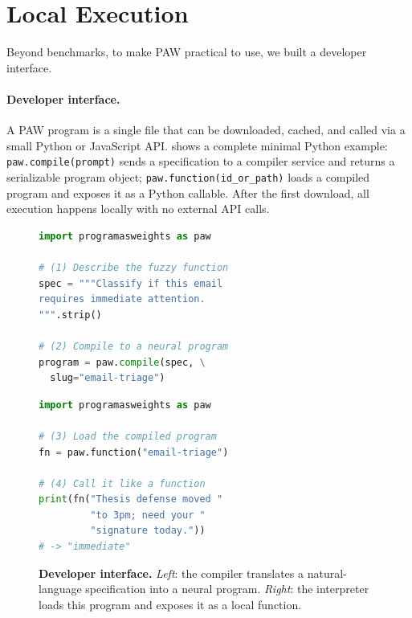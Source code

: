 \documentclass{article}
\theoremstyle{plain}
\theoremstyle{definition}
\theoremstyle{remark}
\begin{document}
\section{Local Execution}
\label{sec:execution}

Beyond benchmarks, to make PAW practical to use, we built a developer interface.

\paragraph{Developer interface.}
A PAW program is a single file that can be downloaded, cached, and called via a small Python or JavaScript API.  shows a complete minimal Python example: \texttt{paw.compile(prompt)} sends a specification to a compiler service and returns a serializable program object; \texttt{paw.function(id\_or\_path)} loads a compiled program and exposes it as a Python callable. After the first download, all execution happens locally with no external API calls.

\begin{figure}[!t]
  \centering
  \begin{minipage}[t]{0.48\textwidth}
  \vspace{0pt}
  \begin{lstlisting}[language=Python,
      basicstyle=\ttfamily\small,
      keywordstyle=\color{blue!60!black},
      commentstyle=\color{green!50!black},
      stringstyle=\color{orange!70!black},
      showstringspaces=false,
      frame=single,
      caption={Compile a fuzzy function},
      captionpos=b]
import programasweights as paw

# (1) Describe the fuzzy function
spec = """Classify if this email  
requires immediate attention.
""".strip()

# (2) Compile to a neural program
program = paw.compile(spec, \
  slug="email-triage")
  \end{lstlisting}
  \end{minipage}
  \hfill
  \begin{minipage}[t]{0.48\textwidth}
  \vspace{0pt}
  \begin{lstlisting}[language=Python,
      basicstyle=\ttfamily\small,
      keywordstyle=\color{blue!60!black},
      commentstyle=\color{green!50!black},
      stringstyle=\color{orange!70!black},
      showstringspaces=false,
      frame=single,
      caption={Run the compiled program locally},
      captionpos=b]
import programasweights as paw

# (3) Load the compiled program
fn = paw.function("email-triage")

# (4) Call it like a function
print(fn("Thesis defense moved "
         "to 3pm; need your "
         "signature today."))
# -> "immediate"
  \end{lstlisting}
  \end{minipage}
  \caption{\label{fig:paw-api}\textbf{Developer interface.} \emph{Left}: the compiler translates a natural-language specification into a neural program. \emph{Right}: the interpreter loads this program and exposes it as a local function.}
\end{figure}
\end{document}
